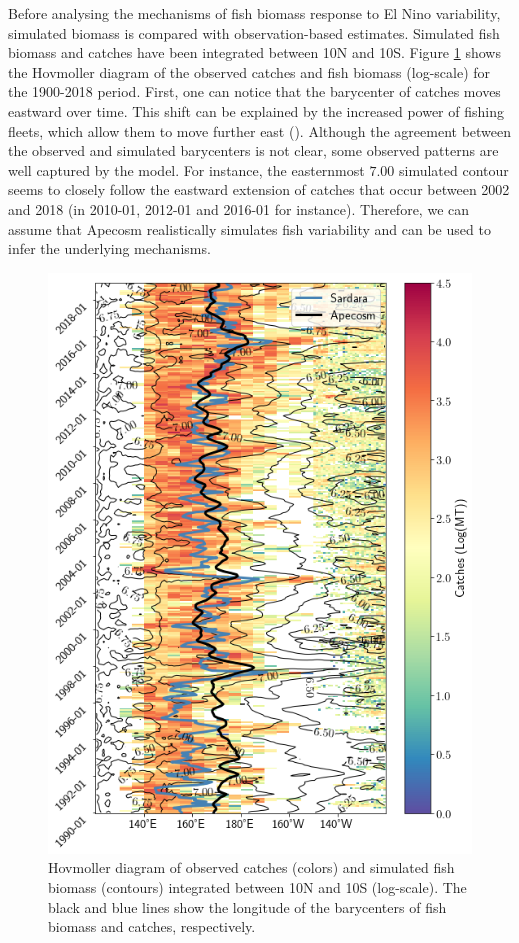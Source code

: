 Before analysing the mechanisms of fish biomass response to El Nino variability, simulated biomass is compared with observation-based estimates. Simulated fish biomass and catches have been integrated between 10N and 10S. Figure \ref{fig:apecosm_validation} shows the Hovmoller diagram of the observed catches and fish biomass (log-scale) for the 1900-2018 period.
First, one can notice that the barycenter of catches moves eastward over time. This shift can be explained by the increased power of fishing fleets, which allow them to move further east (). Although the agreement between the observed and simulated barycenters is not clear, some observed patterns are well captured by the model. For instance, the easternmost $7.00$ simulated contour seems to closely follow the eastward extension of catches that occur between 2002 and 2018 (in 2010-01, 2012-01 and 2016-01 for instance). Therefore, we can assume that Apecosm realistically simulates fish variability and can be used to infer the underlying mechanisms.

\begin{figure}
	\centering
	\includegraphics[scale=0.5]{figs/plot_validation_apecosm.png}
	\caption{Hovmoller diagram of observed catches (colors) and simulated fish biomass (contours) integrated between 10N and 10S (log-scale). The black and blue lines show the longitude of the barycenters of fish biomass and catches, respectively.}
	\label{fig:apecosm_validation}
\end{figure}
